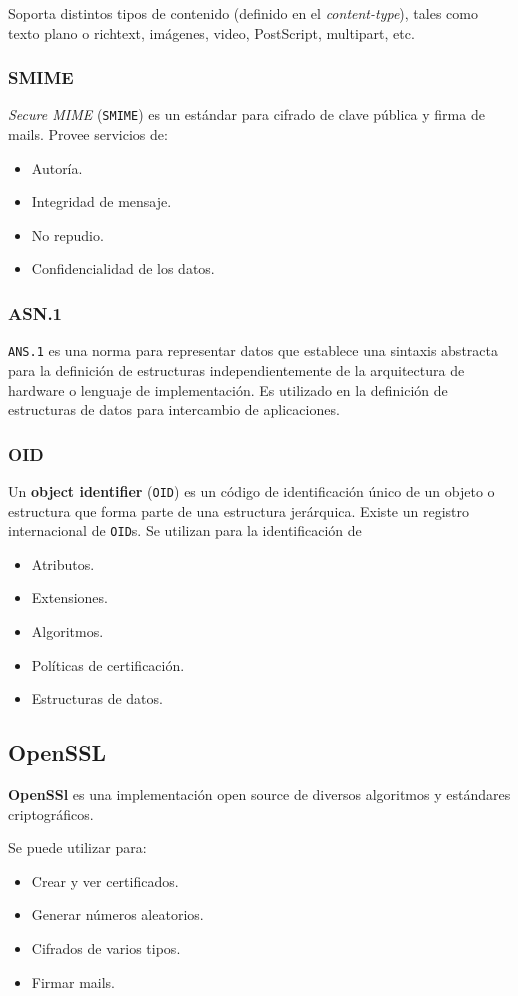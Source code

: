 Soporta distintos tipos de contenido (definido en el \emph{content-type}), tales como texto plano o richtext, imágenes, video, PostScript, multipart, etc.

\subsubsection{SMIME}
\emph{Secure MIME} (\texttt{SMIME}) es un estándar para cifrado de clave pública y firma de mails. Provee servicios de:
\begin{itemize}
	\item Autoría.
	\item Integridad de mensaje.
	\item No repudio.
	\item Confidencialidad de los datos.
\end{itemize}

\subsubsection{ASN.1}
\texttt{ANS.1} es una norma para representar datos que establece una sintaxis abstracta para la definición de estructuras independientemente de la arquitectura de hardware o lenguaje de implementación. Es utilizado en la definición de estructuras de datos para intercambio de aplicaciones.

\subsubsection{OID}
Un \textbf{object identifier} (\texttt{OID}) es un código de identificación único de un objeto o estructura que forma parte de una estructura jerárquica. Existe un registro internacional de \texttt{OID}s. Se utilizan para la identificación de 
\begin{itemize}
	\item Atributos.
	\item Extensiones.
	\item Algoritmos.
	\item Políticas de certificación.
	\item Estructuras de datos.
\end{itemize}

\subsection{OpenSSL}
\textbf{OpenSSl} es una implementación open source de diversos algoritmos y estándares criptográficos.

Se puede utilizar para:
\begin{itemize}
	\item Crear y ver certificados.
	\item Generar números aleatorios.
	\item Cifrados de varios tipos.
	\item Firmar mails.
\end{itemize}

